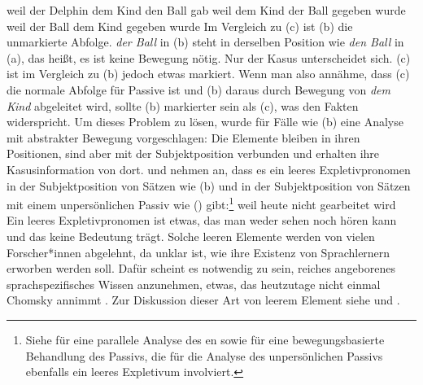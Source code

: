 \eal
\label{ex-passive-German-no-movement}
\ex 
weil der Delphin dem Kind den Ball gab
\ex 
weil    dem        Kind  der        Ball gegeben wurde
\ex 
weil    der        Ball dem        Kind  gegeben wurde
\zl
Im Vergleich zu (c) ist (b) die unmarkierte Abfolge. \emph{der Ball} in (b) steht
in derselben Position wie \emph{den Ball} in (a), das heißt, es ist keine Bewegung nötig. Nur der Kasus unterscheidet sich.
(c) ist im Vergleich zu (b) jedoch etwas markiert. Wenn man also annähme, dass (c)
die normale Abfolge für Passive ist und (b) daraus durch Bewegung von \emph{dem
  Kind} abgeleitet wird, sollte (b) markierter sein als (c), was den
Fakten widerspricht. Um dieses Problem zu lösen, wurde für Fälle wie (b) eine Analyse mit abstrakter Bewegung vorgeschlagen: Die Elemente bleiben in ihren Positionen, sind aber mit
der Subjektposition verbunden und erhalten ihre Kasusinformation von
dort. \textcites[155--157]{Grewendorf88a}[]{Grewendorf93} und \citet[462--463]{SS88a}
nehmen an, dass es ein leeres Expletivpronomen
in der Subjektposition von Sätzen wie (b) und in der Subjektposition von Sätzen mit einem
unpersönlichen Passiv wie () gibt:\footnote{%
	Siehe  für eine parallele Analyse des en sowie
	 für eine bewegungsbasierte Behandlung des Passivs, die für die Analyse des unpersönlichen Passivs ebenfalls ein
        leeres Expletivum involviert.
}
\ea
weil    heute nicht gearbeitet wird
\z
Ein leeres Expletivpronomen ist etwas, das man weder sehen noch hören kann und das keine
Bedeutung trägt. Solche leeren Elemente werden von vielen Forscher*innen abgelehnt, da unklar ist, wie ihre
Existenz von Sprachlernern erworben werden soll. Dafür scheint es notwendig zu sein, reiches angeborenes
sprachspezifisches Wissen anzunehmen, etwas, das heutzutage nicht einmal Chomsky annimmt \citep*{HCF2002a}. Zur Diskussion
dieser Art von leerem Element siehe  und .

